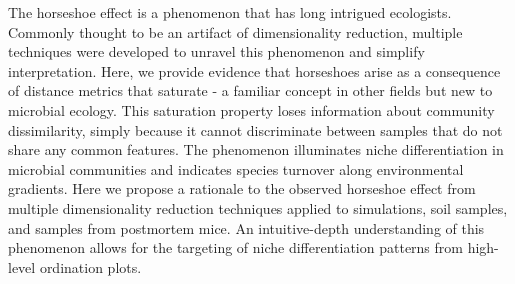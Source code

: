 The horseshoe effect is a phenomenon that has long intrigued ecologists.  Commonly thought to be an artifact of dimensionality reduction, multiple techniques were developed to unravel this phenomenon and simplify interpretation.  Here, we provide evidence that horseshoes arise as a consequence of distance metrics that saturate - a familiar concept in other fields but new to microbial ecology.   This saturation property loses information about community dissimilarity, simply because it cannot discriminate between samples that do not share any common features. The phenomenon illuminates niche differentiation in microbial communities and indicates species turnover along environmental gradients.  Here we propose a rationale to the observed horseshoe effect from multiple dimensionality reduction techniques applied to simulations, soil samples, and samples from postmortem mice.   An intuitive-depth understanding of this phenomenon allows for the targeting of niche differentiation patterns from high-level ordination plots.
